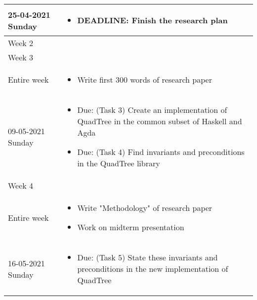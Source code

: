 \documentclass[english]{article}
\begin{document}
\begin{center}
\begin{tabular}{| p{} | p{} | }
25-04-2021 Sunday    & 
\begin{minipage}[t]{0.65\textwidth} \begin{itemize}
    \item DEADLINE: Finish the research plan
\end{itemize} \end{minipage} \\   
\hline

\multicolumn{2}{l}{Week 2} \\
\hline

\multicolumn{2}{l}{Week 3} \\
\hline

Entire week    & 
\begin{minipage}[t]{0.65\textwidth} \begin{itemize}
    \item Write first 300 words of research paper
\end{itemize} \end{minipage} \\   
\hline

09-05-2021 Sunday    & 
\begin{minipage}[t]{0.65\textwidth} \begin{itemize}
    \item Due: (Task 3) Create an implementation of QuadTree in the common subset of Haskell and Agda
    \item Due: (Task 4) Find invariants and preconditions in the QuadTree library 
\end{itemize} \end{minipage} \\   
\hline

\multicolumn{2}{l}{Week 4} \\
\hline

Entire week    & 
\begin{minipage}[t]{0.65\textwidth} \begin{itemize}
    \item Write "Methodology" of research paper
    \item Work on midterm presentation
\end{itemize} \end{minipage} \\   
\hline

16-05-2021 Sunday    & 
\begin{minipage}[t]{0.65\textwidth} \begin{itemize}
    \item Due: (Task 5) State these invariants and preconditions in the new implementation of QuadTree
\end{itemize} \end{minipage} \\   
\hline


\end{tabular}
\end{center}
\end{document}

